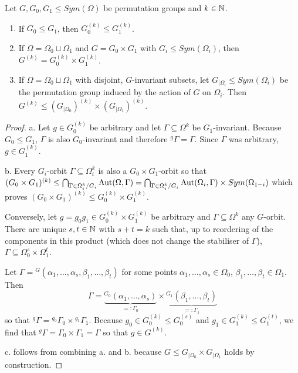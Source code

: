\documentclass[fontsize=11pt,fleqn,a4paper]{scrartcl}
\begin{document}
\begin{lemma}\label{k_closure:monotony_products}
Let $G,G_0,G_1\leq Sym(\Omega)$ be permutation groups and $k\in\mathbb{N}$.
\begin{enumerate}
\item If $G_0\leq G_1$, then $G_0^{(k)} \leq G_1^{(k)}$.
\item If $\Omega=\Omega_0\sqcup\Omega_1$ and $G=G_0\times G_1$ with $G_i\leq Sym(\Omega_i)$, then $G^{(k)} = G_0^{(k)} \times G_1^{(k)}$.
\item If $\Omega=\Omega_0\sqcup\Omega_1$ with disjoint, $G$-invariant subsets, let $G_{|\Omega_i} \leq Sym(\Omega_i)$ be the permutation group induced by the action of $G$ on $\Omega_i$. Then $G^{(k)} \leq (G_{|\Omega_0})^{(k)} \times (G_{|\Omega_1})^{(k)}$.
\end{enumerate}
\end{lemma}
\begin{proof}
a. Let $g\in G_0^{(k)}$ be arbitrary and let $\Gamma\subseteq\Omega^k$ be $G_1$-invariant. Because $G_0\leq G_1$, $\Gamma$ is also $G_0$-invariant and therefore ${^g \Gamma} = \Gamma$. Since $\Gamma$ was arbitrary, $g\in G_1^{(k)}$.

\medbreak
b. Every $G_i$-orbit $\Gamma\subseteq\Omega_i^k$ is also a $G_0\times G_1$-orbit so that $(G_0\times G_1)^{(k)} \leq \bigcap_{\Gamma \in \Omega_i^k / G_i} \operatorname{Aut}(\Omega,\Gamma) = \bigcap_{\Gamma\in\Omega_i^k/G_i} \operatorname{Aut}(\Omega_i,\Gamma) \times Sym(\Omega_{1-i})$ which proves $(G_0 \times G_1)^{(k)} \leq G_0^{(k)} \times G_1^{(k)}$.

Conversely, let $g=g_0g_1\in G_0^{(k)}\times G_1^{(k)}$ be arbitrary and $\Gamma\subseteq\Omega^k$ any $G$-orbit. There are unique $s,t\in\mathbb{N}$ with $s+t=k$ such that, up to reordering of the components in this product (which does not change the stabiliser of $\Gamma$), $\Gamma\subseteq \Omega_0^s\times\Omega_1^t$.

Let $\Gamma = {^G(\alpha_1,\ldots,\alpha_s,\beta_1,\ldots,\beta_t)}$ for some points $\alpha_1,\ldots,\alpha_s\in\Omega_0$, $\beta_1,\ldots,\beta_t\in\Omega_1$. Then
\[\Gamma = \underbrace{^{G_0}(\alpha_1,\ldots,\alpha_s)}_{=:\Gamma_0}\times\underbrace{^{G_1}(\beta_1,\ldots,\beta_t)}_{=:\Gamma_1}\]
so that ${^g \Gamma} = {^{g_0}\Gamma_0}\times{^{g_1}\Gamma_1}$. Because $g_0\in G_0^{(k)} \leq G_0^{(s)}$ and $g_1\in G_1^{(k)}\leq G_1^{(t)}$, we find that ${^g\Gamma} = \Gamma_0\times\Gamma_1 = \Gamma$ so that $g\in G^{(k)}$.

\medbreak
c. follows from combining a. and b. because $G\leq G_{|\Omega_0} \times G_{|\Omega_1}$ holds by construction.
\end{proof}
\end{document}
